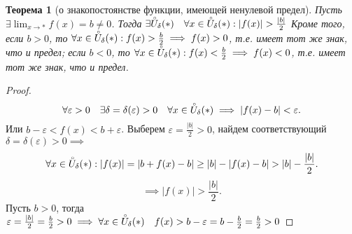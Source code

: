 \documentclass[a4paper,12pt]{article} %
\newtheorem{theorem}{Теорема}[subsection]
\theoremstyle{remark}
\begin{document}
\begin{theorem}[о знакопостоянстве функции, имеющей ненулевой предел]
	Пусть $\exists  \lim_{x \to *} f(x) = b \neq 0$. Тогда $\exists \accentset{\circ}{U}_\delta(*) \quad \forall x \in \accentset{\circ}{U}_\delta(*) : |f(x)| > \frac{|b|}{2}$ 
	Кроме того, если $b>0$, то  $\forall x \in \accentset{\circ}{U}_\delta(*) : f(x) > \frac{b}{2} \implies f(x) > 0$, т.е. имеет тот же знак, что и предел;
	если $b<0$, то $\forall x \in  \accentset{\circ}{U}_\delta(*) : f(x) < \frac{b}{2} \implies f(x) <0$, т.е. имеет тот же знак, что и предел.
\end{theorem}

\begin{proof}
	\[
	\forall \varepsilon> 0 \quad \exists \delta=\delta(\varepsilon)>0 \quad \forall x\in \accentset    {\circ}{U}_\delta(*) \implies |f(x) - b| < \varepsilon
	.\] 
	Или $b - \varepsilon < f(x) < b + \varepsilon$.
	Выберем $\varepsilon = \frac{|b|}{2} > 0$, найдем соответствующий $\delta = \delta(\varepsilon) > 0 \implies$
	\[
	\forall x \in  \accentset{\circ}{U}_\delta(*) : |f(x)| = |b + f(x) - b| \ge  |b| - |f(x) - b| > |b| - \frac{|b|}{2}
	.\] 
	\[
	\implies |f(x)| > \frac{|b|}{2}
	.\] 
Пусть $b > 0$, тогда $\varepsilon = \frac{|b|}{2} = \frac{b}{2} > 0 \implies \forall x \in  \accentset{\circ}{U}_\delta(*) \quad f(x) > b - \varepsilon = b - \frac{b}{2} = \frac{b}{2} > 0$
\end{proof}
\end{document}
